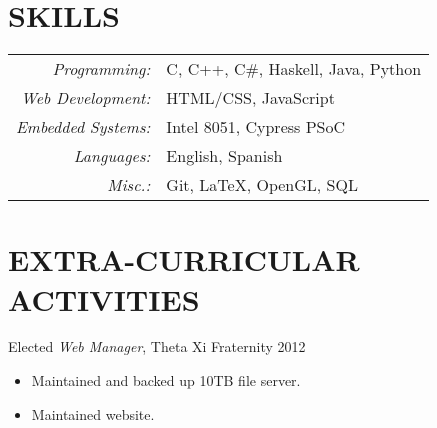 \documentclass[line,margin]{res}
\begin{document}
\begin{resume}
\section{SKILLS} \begin{tabular}{rl}
		{\sl Programming:} & C, C++, C\#, Haskell, Java, Python \\
		{\sl Web Development:} & HTML/CSS, JavaScript \\
		{\sl Embedded Systems:} & Intel 8051, Cypress PSoC \\
                {\sl Languages:} & English, Spanish \\
		{\sl Misc.:} & Git, \LaTeX, OpenGL, SQL%
		\end{tabular}





%			


\section{EXTRA-CURRICULAR \\ ACTIVITIES}
	    
            Elected {\it Web Manager}, Theta Xi Fraternity \hfill 2012 \\
 		\vspace{-4mm} \begin{itemize} \setlength{\itemsep}{-2pt}
		\item Maintained and backed up 10TB file server.
		\item Maintained website.
		\end{itemize}


\end{resume}
\end{document}
